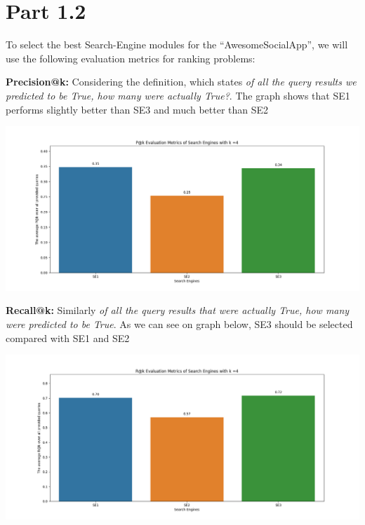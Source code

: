 \documentclass[10pt]{article}
\begin{document}
\section{Part 1.2}

To select the best Search-Engine modules for the “AwesomeSocialApp”, we will use the following evaluation metrics for ranking problems:

\textbf{Precision@k:} Considering the definition, which states \textit{of all the query results we predicted to be True, how many were actually True?}. The graph shows that SE1 performs slightly better than SE3 and much better than SE2

\begin{center}
\includegraphics[scale=.25]{Pk.png}
\end{center}

\textbf{Recall@k:} Similarly \textit{of all the query results that were actually True, how many were predicted to be True}. As we can see on graph below, SE3 should be selected compared with SE1 and SE2

\begin{center}
\includegraphics[scale=.25]{Rk.png}
\end{center}
\end{document}
